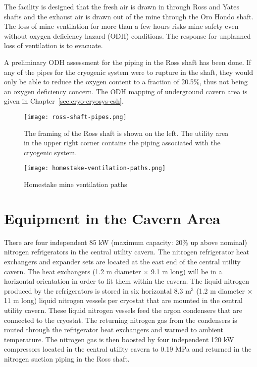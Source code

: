 The facility is designed that the fresh air is drawn
in through Ross and Yates shafts
and the exhaust
air is drawn out of the mine through the Oro Hondo shaft.
The loss of mine ventilation for more than a few hours risks mine safety
even without oxygen deficiency hazard (ODH) conditions.
The response for unplanned loss of ventilation is to evacuate.

A preliminary ODH assessment for 
the piping in the Ross shaft has been done. If any of the pipes
for the cryogenic system were to rupture in the shaft, they would
only be able to reduce the oxygen content to a fraction of 20.5\%, 
thus not being an oxygen deficiency concern. The ODH mapping
of underground cavern area is given in Chapter~\ref{sec:cryo-cryosys-esh}.

\begin{figure}[htbp]
\centering
\texttt{[image: ross-shaft-pipes.png]} 
\caption[Framing of the Ross shaft and piping]{The framing of the Ross shaft is shown on the left. The utility area in the upper
right corner contains the piping
associated with the cryogenic system.}
\label{fig:framing-at-ross-piping}
\end{figure}

\begin{figure}[htbp]
\centering
\texttt{[image: homestake-ventilation-paths.png]} 
\caption{Homestake mine ventilation paths}
\label{fig:ventilation-paths}
\end{figure}

\chapter{Equipment in the Cavern Area}
\label{sec:cryo-cryosys-equip-cavern}

There are four independent 85 kW (maximum capacity: 20\% up above nominal) 
nitrogen refrigerators in the central utility cavern. The nitrogen
refrigerator heat exchangers and expander sets are located 
at the east end of the central utility cavern.
The heat exchangers (1.2 m diameter $\times$ 9.1 m long) 
will be in a horizontal orientation in order to
fit them within the cavern. The liquid nitrogen produced 
by the refrigerators is stored in six horizontal 
8.3 m$^3$ (1.2 m diameter $\times$ 11 m long) liquid 
nitrogen vessels per cryostat that are mounted in the
central utility cavern. These liquid nitrogen vessels
feed the argon condensers that are connected 
to the cryostat. The returning nitrogen gas from the 
condensers is routed through the refrigerator heat 
exchangers and warmed to ambient temperature. The 
nitrogen gas is then boosted by four independent 120 kW 
compressors located in the central utility cavern to 0.19 MPa 
and returned in the nitrogen suction piping 
in the Ross shaft.

